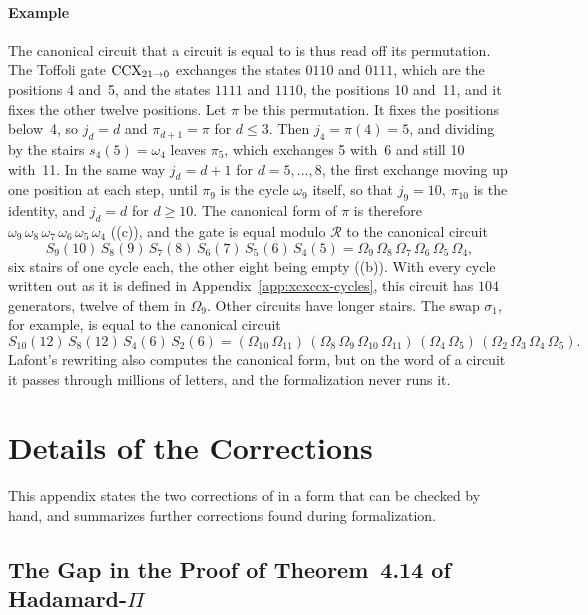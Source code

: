\documentclass[acmsmall,screen,nonacm]{acmart}
\begin{document}
\paragraph{Example} The canonical circuit that a circuit is equal to is thus read off its permutation. The Toffoli gate $\mathrm{CCX}_{21\to0}$ exchanges the states $0110$ and $0111$, which are the positions 4 and~5, and the states $1111$ and $1110$, the positions 10 and~11, and it fixes the other twelve positions. Let $\pi$ be this permutation. It fixes the positions below~4, so $j_d=d$ and $\pi_{d+1}=\pi$ for $d\le3$. Then $j_4=\pi(4)=5$, and dividing by the stairs $s_4(5)=\omega_4$ leaves $\pi_5$, which exchanges 5 with~6 and still 10 with~11. In the same way $j_d=d+1$ for $d=5,\dots,8$, the first exchange moving up one position at each step, until $\pi_9$ is the cycle $\omega_9$ itself, so that $j_9=10$, $\pi_{10}$ is the identity, and $j_d=d$ for $d\ge10$. The canonical form of $\pi$ is therefore $\omega_9\,\omega_8\,\omega_7\,\omega_6\,\omega_5\,\omega_4$ ((c)), and the gate is equal modulo $\mathcal{R}$ to the canonical circuit
\[
S_9(10)\,S_8(9)\,S_7(8)\,S_6(7)\,S_5(6)\,S_4(5)=\Omega_9\,\Omega_8\,\Omega_7\,\Omega_6\,\Omega_5\,\Omega_4 ,
\]
six stairs of one cycle each, the other eight being empty ((b)). With every cycle written out as it is defined in Appendix~\ref{app:xcxccx-cycles}, this circuit has $104$ generators, twelve of them in $\Omega_9$. Other circuits have longer stairs. The swap $\sigma_1$, for example, is equal to the canonical circuit
\[
S_{10}(12)\,S_8(12)\,S_4(6)\,S_2(6)=(\Omega_{10}\,\Omega_{11})\,(\Omega_8\,\Omega_9\,\Omega_{10}\,\Omega_{11})\,(\Omega_4\,\Omega_5)\,(\Omega_2\,\Omega_3\,\Omega_4\,\Omega_5).
\]
Lafont's rewriting also computes the canonical form, but on the word of a circuit it passes through millions of letters, and the formalization never runs it.

\fi

\section{Details of the Corrections}\label{app:corrections}

This appendix states the two corrections of  in a form that can be checked by hand, and summarizes further corrections found during formalization.

\subsection{The Gap in the Proof of Theorem~4.14 of Hadamard-\texorpdfstring{$\Pi$}{Pi}}\label{app:corr-hpi}
\end{document}
